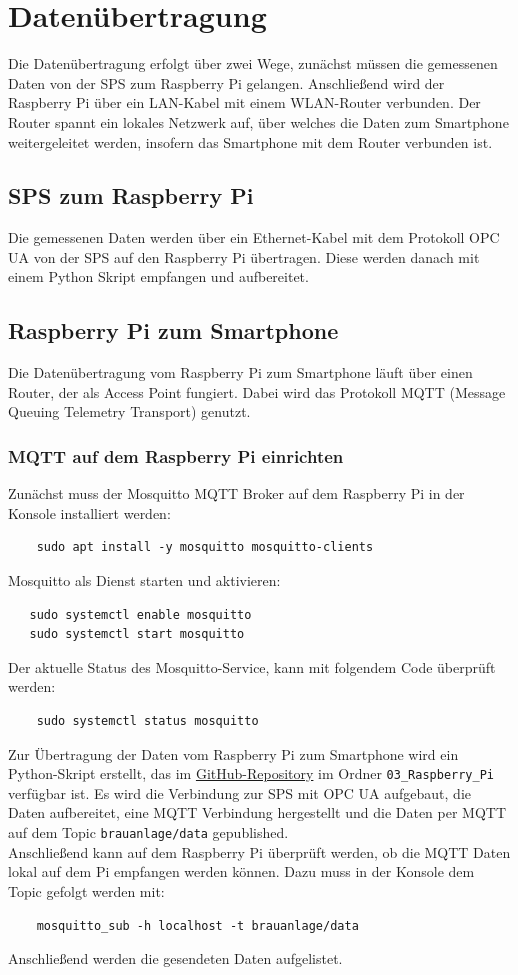 \clearpage
\section{Datenübertragung}
Die Datenübertragung erfolgt über zwei Wege, zunächst müssen die gemessenen Daten von der SPS zum Raspberry Pi gelangen. Anschließend wird der Raspberry Pi über ein LAN-Kabel mit einem WLAN-Router verbunden. Der Router spannt ein lokales Netzwerk auf, über welches die Daten zum Smartphone weitergeleitet werden, insofern das Smartphone mit dem Router verbunden ist.

\subsection{SPS zum Raspberry Pi}
Die gemessenen Daten werden über ein Ethernet-Kabel mit dem Protokoll OPC UA von der SPS auf den Raspberry Pi übertragen. Diese werden danach mit einem Python Skript empfangen und aufbereitet.

\subsection{Raspberry Pi zum Smartphone}
Die Datenübertragung vom Raspberry Pi zum Smartphone läuft über einen Router, der als Access Point fungiert. Dabei wird das Protokoll MQTT (Message Queuing Telemetry Transport) genutzt.
\subsubsection{MQTT auf dem Raspberry Pi einrichten}
Zunächst muss der Mosquitto MQTT Broker auf dem Raspberry Pi in der Konsole installiert werden:
\begin{lstlisting}
    sudo apt install -y mosquitto mosquitto-clients
\end{lstlisting}
Mosquitto als Dienst starten und aktivieren:
\begin{lstlisting}
   sudo systemctl enable mosquitto
   sudo systemctl start mosquitto 
\end{lstlisting}
Der aktuelle Status des Mosquitto-Service, kann mit folgendem Code überprüft werden:
\begin{lstlisting}
    sudo systemctl status mosquitto
\end{lstlisting}
\noindent
Zur Übertragung der Daten vom Raspberry Pi zum Smartphone wird ein Python-Skript erstellt, das im \href{https://github.com/NiklasFelhauer/Projektarbeit_AR_App/tree/main/03_Raspberry_Pi}{GitHub-Repository} im Ordner \texttt{03\_Raspberry\_Pi} verfügbar ist. Es wird die Verbindung zur SPS mit OPC UA aufgebaut, die Daten aufbereitet, eine MQTT Verbindung hergestellt und die Daten per MQTT auf dem Topic \texttt{brauanlage/data} gepublished.
\\ \noindent
Anschließend kann auf dem Raspberry Pi überprüft werden, ob die MQTT Daten lokal auf dem Pi empfangen werden können. Dazu muss in der Konsole dem Topic gefolgt werden mit:
\begin{lstlisting}
    mosquitto_sub -h localhost -t brauanlage/data
\end{lstlisting}
Anschließend werden die gesendeten Daten aufgelistet. 

